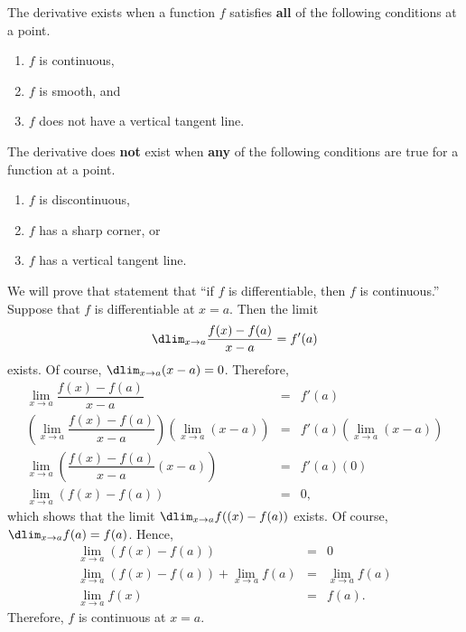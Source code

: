 \documentclass{book}
\begin{document}
\begin{Thm} The derivative exists when a function $f$ satisfies \textbf{all} of the following conditions at a point.
\begin{enumerate}
\item $f$ is continuous,
\item $f$ is smooth, and
\item $f$ does not have a vertical tangent line.
\end{enumerate} 

The derivative does \textbf{not} exist when \textbf{any} of the following conditions are true for a function at a point.
\begin{enumerate}
\item $f$ is discontinuous,
\item $f$ has a sharp corner, or
\item $f$ has a vertical tangent line.
\end{enumerate}
\end{Thm}
\begin{pf} We will prove that statement that ``if $f$ is differentiable, then $f$ is continuous.''\\

Suppose that $f$ is differentiable at $x=a$. Then the limit \[\dlim_{x\to a} \dfrac{f(x) - f(a)}{x-a} = f'(a)\] exists. Of course, $\dlim_{x\to a} (x-a) = 0$. Therefore, 
\begin{eqnarray*}
\lim_{x\to a} \dfrac{f(x) - f(a)}{x-a} &=& f'(a)\\
\left(\lim_{x\to a} \dfrac{f(x) - f(a)}{x-a}\right)\left(\lim_{x\to a} (x-a)\right) &=& f'(a)\left(\lim_{x\to a} (x-a)\right)\\
\lim_{x\to a} \left(\dfrac{f(x) - f(a)}{x-a}(x-a)\right)  &=& f'(a)(0)\\
\lim_{x\to a} (f(x)-f(a)) &=& 0,
\end{eqnarray*} which shows that the limit $\dlim_{x\to a} f((x)- f(a))$ exists. Of course, $\dlim_{x\to a} f(a) = f(a)$. Hence, 
\begin{eqnarray*}
\lim_{x\to a} (f(x)- f(a)) &=& 0\\
\lim_{x\to a} (f(x)- f(a))  + \lim_{x\to a} f(a)&=& \lim_{x\to a} f(a)\\
\lim_{x\to a} f(x) &=& f(a).
\end{eqnarray*}
 Therefore, $f$ is continuous at $x=a$.
\end{pf}\vs
\end{document}
